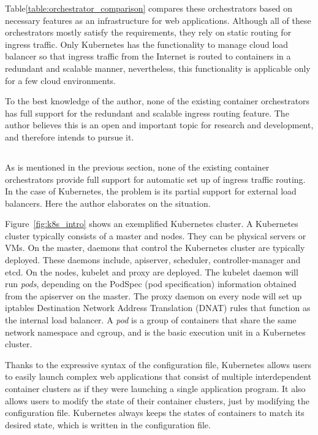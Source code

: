 Table\ref{table:orchestrator_comparison} compares these orchestrators based on necessary features as an infrastructure for web applications.
Although all of these orchestrators mostly satisfy the requirements, they rely on static routing for ingress traffic.
Only Kubernetes has the functionality to manage cloud load balancer so that ingress traffic from the Internet is routed to containers in a redundant and scalable manner, nevertheless, this functionality is applicable only for a few cloud environments.

To the best knowledge of the author, none of the existing container orchestrators has full support for the redundant and scalable ingress routing feature.
The author believes this is an open and important topic for research and development, and therefore intends to pursue it.

\subsection{}

As is mentioned in the previous section, none of the existing container orchestrators provide full support for automatic set up of ingress traffic routing.
In the case of Kubernetes, the problem is its partial support for external load balancers.
Here the author elaborates on the situation.

Figure~\ref{fig:k8s_intro} shows an exemplified Kubernetes cluster.
A Kubernetes cluster typically consists of a master and nodes. They can be physical servers or VMs.
On the master, daemons that control the Kubernetes cluster are typically deployed. 
These daemons include, apiserver, scheduler, controller-manager and etcd. 
On the nodes, kubelet and proxy are deployed.
The kubelet daemon will run {\it pods}, depending on the PodSpec (pod specification) information obtained from the apiserver on the master.
The proxy daemon on every node will set up iptables Destination Network Address Translation (DNAT) rules that function as the internal load balancer.
A {\em pod} is a group of containers that share the same network namespace and cgroup,
and is the basic execution unit in a Kubernetes cluster.

Thanks to the expressive syntax of the configuration file, Kubernetes allows users to easily launch complex web applications that consist of multiple interdependent container clusters as if they were launching a single application program.
It also allows users to modify the state of their container clusters, just by modifying the configuration file.
Kubernetes always keeps the states of containers to match its desired state, which is written in the configuration file.

